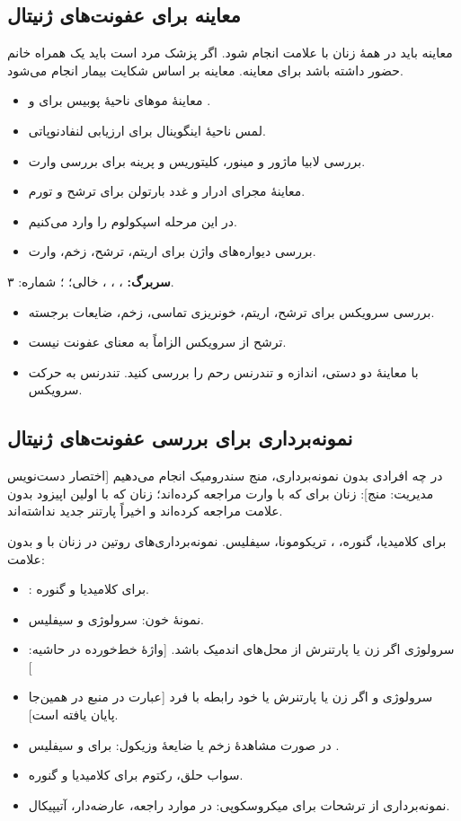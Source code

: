 \documentclass[12pt,a4paper]{article}
\begin{document}
\subsection*{معاینه برای عفونت‌های ژنیتال}
معاینه باید در همهٔ زنان با علامت انجام شود.
اگر پزشک مرد است باید یک همراه خانم حضور داشته باشد برای معاینه.
معاینه بر اساس شکایت بیمار انجام می‌شود.
\begin{itemize}
\item معاینهٔ موهای ناحیهٔ پوبیس برای  و .
\item لمس ناحیهٔ اینگوینال برای ارزیابی لنفادنوپاتی.
\item بررسی لابیا ماژور و مینور، کلیتوریس و پرینه برای بررسی وارت.
\item معاینهٔ مجرای ادرار و غدد بارتولن برای ترشح و تورم.
\item در این مرحله اسپکولوم  را وارد می‌کنیم.
\item بررسی دیواره‌های واژن برای اریتم، ترشح، زخم، وارت.
\end{itemize}
\textbf{سربرگ:} ، ، ،  خالی؛ ؛ شماره: ۳.
\begin{itemize}
\item بررسی سرویکس برای ترشح، اریتم، خونریزی تماسی، زخم، ضایعات برجسته.
\item ترشح  از سرویکس الزاماً به معنای عفونت نیست.
\item با معاینهٔ دو دستی، اندازه و تندرنس رحم را بررسی کنید. تندرنس به حرکت سرویکس.
\end{itemize}
\subsection*{نمونه‌برداری برای بررسی عفونت‌های ژنیتال}
در چه افرادی بدون نمونه‌برداری، منج سندرومیک انجام می‌دهیم [اختصار دست‌نویس مدیریت: منج]:
زنان  برای  که با وارت مراجعه کرده‌اند؛ زنان  که با اولین اپیزود  بدون علامت مراجعه کرده‌اند و اخیراً پارتنر جدید نداشته‌اند.

 برای کلامیدیا، گنوره، ، تریکومونا، سیفلیس.
نمونه‌برداری‌های روتین در زنان با و بدون علامت:
\begin{itemize}
\item {}:  برای کلامیدیا و گنوره.
\item نمونهٔ خون: سرولوژی  و سیفلیس.
\item سرولوژی  اگر زن یا پارتنرش از محل‌های اندمیک باشد. [واژهٔ خط‌خورده در حاشیه: ]
\item سرولوژی  و  اگر زن یا پارتنرش  یا خود رابطه با فرد [عبارت در منبع در همین‌جا پایان یافته است].
\item در صورت مشاهدهٔ زخم یا ضایعهٔ وزیکول:  برای  و سیفلیس .
\item سواب حلق، رکتوم برای  کلامیدیا و گنوره.
\item نمونه‌برداری از ترشحات برای میکروسکوپی: در موارد راجعه، عارضه‌دار، آتیپیکال.
\end{itemize}
\end{document}
